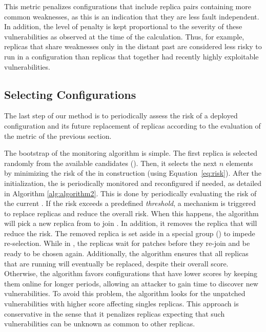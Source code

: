 This metric penalizes configurations that include replica pairs containing more common weaknesses, as this is an indication that they are less fault independent.
In addition, the level of penalty is kept proportional to the severity of these vulnerabilities as observed at the time of the calculation. 
Thus, for example, replicas that share weaknesses only in the distant past are considered less risky to run in a configuration than replicas that together had recently highly exploitable vulnerabilities.

\subsection{Selecting Configurations}
\label{sec:configurations}

The last step of our method is to periodically assess the risk of a deployed configuration and its future replacement of replicas according to the evaluation of the metric of the previous section.

The bootstrap of the monitoring algorithm is simple. 
The first replica is selected randomly from the available candidates (\RS).
Then, it selects the next $n$ elements by minimizing the risk of the \ES in construction (using Equation~\ref{eq:risk}).
After the initialization, the \ES is periodically monitored and reconfigured if needed, as detailed in Algorithm \ref{alg:algorithm2}.
This is done by periodically evaluating the risk of the current \ES. 
If the risk exceeds a predefined \emph{threshold}, a mechanism is triggered to replace replicas and reduce the overall risk.
When this happens, the algorithm will pick a new replica from \RS to join \ES. 
In addition, it removes the replica that will reduce the risk.
The removed replica is set aside in a special group (\QS) to impede re-selection.
While in \QS, the replicas wait for patches before they re-join \RS and be ready to be chosen again.
Additionally, the algorithm ensures that all replicas that are running will eventually be replaced, despite their overall score.
Otherwise, the algorithm favors configurations that have lower scores by keeping them online for longer periods, allowing an attacker to gain time to discover new vulnerabilities.
To avoid this problem, the algorithm looks for the unpatched vulnerabilities with higher score affecting singles replicas.
This approach is conservative in the sense that it penalizes replicas expecting that such vulnerabilities can be unknown as common to other replicas.

